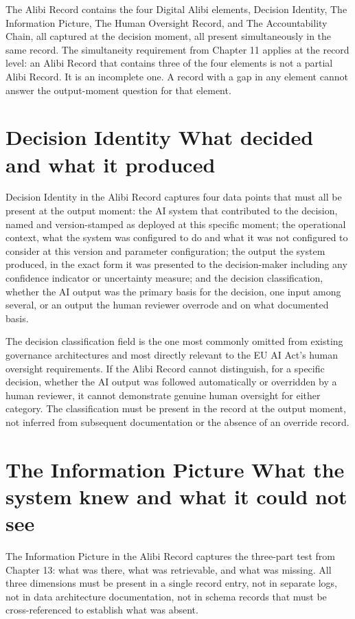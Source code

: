 The Alibi Record contains the four Digital Alibi elements, Decision Identity, The Information Picture, The Human Oversight Record, and The Accountability Chain, all captured at the decision moment, all present simultaneously in the same record. The simultaneity requirement from Chapter 11 applies at the record level: an Alibi Record that contains three of the four elements is not a partial Alibi Record. It is an incomplete one. A record with a gap in any element cannot answer the output-moment question for that element.

\section{Decision Identity What decided and what it produced}

Decision Identity in the Alibi Record captures four data points that must all be present at the output moment: the AI system that contributed to the decision, named and version-stamped as deployed at this specific moment; the operational context, what the system was configured to do and what it was not configured to consider at this version and parameter configuration; the output the system produced, in the exact form it was presented to the decision-maker including any confidence indicator or uncertainty measure; and the decision classification, whether the AI output was the primary basis for the decision, one input among several, or an output the human reviewer overrode and on what documented basis.

The decision classification field is the one most commonly omitted from existing governance architectures and most directly relevant to the EU AI Act's human oversight requirements. If the Alibi Record cannot distinguish, for a specific decision, whether the AI output was followed automatically or overridden by a human reviewer, it cannot demonstrate genuine human oversight for either category. The classification must be present in the record at the output moment, not inferred from subsequent documentation or the absence of an override record.

\section{The Information Picture What the system knew and what it could not see}

The Information Picture in the Alibi Record captures the three-part test from Chapter 13: what was there, what was retrievable, and what was missing. All three dimensions must be present in a single record entry, not in separate logs, not in data architecture documentation, not in schema records that must be cross-referenced to establish what was absent.

